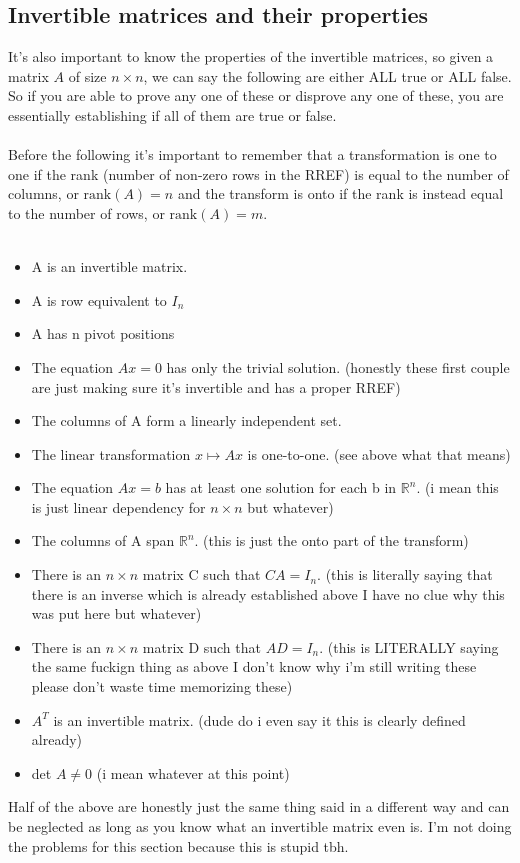 \documentclass{report}
\begin{document}
\begin{multicols}{2}
\section{Invertible matrices and their properties}%
\label{sec: Invertible matrices and their properties }
It's also important to know the properties of the invertible matrices, so given a matrix $ A $ of size $ n \times n $, we can say the following are either ALL true or ALL false. So if you are able to prove any one of these or disprove any one of these, you are essentially establishing if all of them are true or false. \\\\
Before the following it's important to remember that a transformation is one to one if the rank (number of non-zero rows in the RREF) is equal to the number of columns, or $ \text{rank}\left( A \right) = n $ and the transform is onto if the rank is instead equal to the number of rows, or $ \text{rank}\left( A \right) = m $. \\\\
\begin{itemize}
	\item A is an invertible matrix.
	\item A is row equivalent to $ I_n $
	\item A has n pivot positions
	\item The equation $ Ax = 0 $ has only the trivial solution. (honestly these first couple are just making sure it's invertible and has a proper RREF)
	\item The columns of A form a linearly independent set.
	\item The linear transformation $ x \mapsto Ax $ is one-to-one. (see above what that means)
	\item The equation $ Ax = b $ has at least one solution for each b in $ \mathbb{R}^n $. (i mean this is just linear dependency for $ n\times n $ but whatever)
	\item The columns of A span $ \mathbb{R}^n $. (this is just the onto part of the transform)
	\item There is an $ n \times n $ matrix C such that $ CA = I_n $. (this is literally saying that there is an inverse which is already established above I have no clue why this was put here but whatever)
	\item There is an $ n \times n $ matrix D such that $ AD = I_n $. (this is LITERALLY saying the same fuckign thing as above I don't know why i'm still writing these please don't waste time memorizing these)
	\item $ A^{ T } $ is an invertible matrix. (dude do i even say it this is clearly defined already)
	\item det $ A \neq 0 $ (i mean whatever at this point)
\end{itemize}
Half of the above are honestly just the same thing said in a different way and can be neglected as long as you know what an invertible matrix even is. I'm not doing the problems for this section because this is stupid tbh.

\end{multicols}
\end{document}
